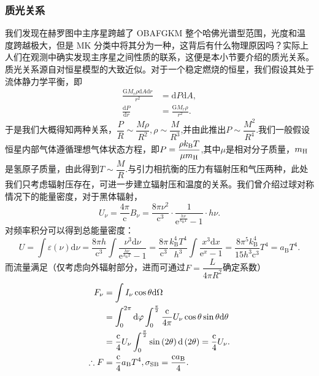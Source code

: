 \documentclass[../天体物理基础.tex]{subfiles}
\begin{document}
\subsubsection{质光关系}
我们发现在赫罗图中主序星跨越了 OBAFGKM 整个哈佛光谱型范围，光度和温度跨越极大，但是 MK 分类中将其分为一种，这背后有什么物理原因吗？实际上人们在观测中确实发现主序星之间性质的联系，这便是本小节要介绍的质光关系。质光关系源自对恒星模型的大致近似。对于一个稳定燃烧的恒星，我们假设其处于流体静力学平衡，即
\begin{align}
\frac{\mathrm{G}M_{r}\rho\mathrm{d}A\mathrm{d}r}{r^{2}}&=\mathrm{d}P\mathrm{d}A,\\
\frac{\mathrm{d}P}{\mathrm{d}r}&=\frac{\mathrm{G}M_{r}\rho}{r^{2}}.\label{1.4.4}
\end{align}
于是我们大概得知两种关系，$\dfrac{P}{R}\sim\dfrac{M\rho}{R^{2}},\rho\sim\dfrac{M}{R^{3}}$,并由此推出$P\sim\dfrac{M^{2}}{R^{4}}$.我们一般假设恒星内部气体遵循理想气体状态方程，即$P=\dfrac{\rho k_{\text{B}}T}{\mu m_{\ce{H}}}$,其中$\mu$是相对分子质量，$m_{\ce{H}}$是氢原子质量，由此得到$T\sim\dfrac{M}{R}$.与引力相抗衡的压力有辐射压和气压两种，此处我们只考虑辐射压存在，可进一步建立辐射压和温度的关系。我们曾介绍过球对称情况下的能量密度，对于黑体辐射，
\begin{equation}
U_{\nu}=\frac{4\pi{}}{\mathrm{c}}B_{\nu}=\frac{8\pi\nu^{2}}{\mathrm{c}^{3}}\cdot\frac{1}{\mathrm{e}^{\frac{h\nu}{k_{\text{B}}T}}-1}\cdot h\nu.
\end{equation}
对频率积分可以得到总能量密度：
\begin{equation}
U=\int\varepsilon\left(\nu\right)\mathrm{d}\nu=\frac{8\pi h}{\mathrm{c}^{3}}\int\frac{\nu^3\mathrm{d}\nu}{\mathrm{e}^{\frac{h\nu}{k_{\text{B}}T}}-1}=\frac{8\pi}{\mathrm{c}^{3}}\frac{k_{\text{B}}^4T^4}{h^3}\int\frac{x^3\mathrm{d}x}{\mathrm{e}^{x}-1}=\frac{8\pi^{5}k_{\text{B}}^{4}}{15h^{3}\mathrm{c}^{3}}T^{4}=a_{\text{B}}T^4.
\end{equation}
而流量满足（仅考虑向外辐射部分，进而可通过$F=\dfrac{L}{4\pi R^{2}}$确定系数）
\begin{align}
F_\nu&=\int I_\nu\cos\theta\mathrm{d}\Omega\notag\\
&=\int_0^{2\pi}\mathrm{d}\varphi\int_0^{\frac{\pi}{2}}\frac{\mathrm{c}}{4\pi}U_\nu\cos\theta\sin\theta\mathrm{d}\theta\notag\\
&=\frac{\mathrm{c}}{4}U_\nu\int_0^{\frac{\pi}{2}}\sin\left(2\theta\right)\mathrm{d}\left(2\theta\right)=\frac{\mathrm{c}}{4}U_\nu.\\
\therefore F&=\frac{\mathrm{c}}{4}a_{\text{B}}T^4,\sigma_{\text{SB}}=\frac{\mathrm{c}a_{\text{B}}}{4}.
\end{align}
\end{document}
